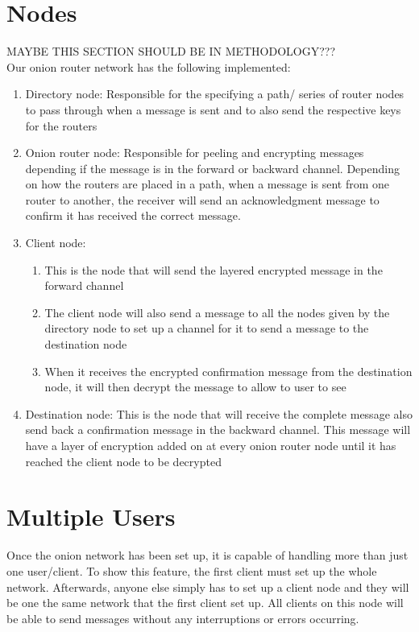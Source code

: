 \documentclass[10pt]{report}
\begin{document}
\section{Nodes}
MAYBE THIS SECTION SHOULD BE IN METHODOLOGY???\\
Our onion router network has the following implemented:
\begin{enumerate}
    \item Directory node: Responsible for the specifying a path/ series of router nodes to pass through when a message is sent and to also send the respective keys for the routers
    \item Onion router node: Responsible for peeling and encrypting messages depending if the message is in the forward or backward channel. Depending on how the routers are placed in a path, when a message is sent from one router to another, the receiver will send an acknowledgment message to confirm it has received the correct message.
    \item Client node:
    \begin{enumerate}
        \item This is the node that will send the layered encrypted message in the forward channel
        \item The client node will also send a message to all the nodes given by the directory node to set up a channel for it to send a message to the destination node
        \item When it receives the encrypted confirmation message from the destination node, it will then decrypt the message to allow to user to see
    \end{enumerate}
    \item Destination node: This is the node that will receive the complete message also send back a confirmation message in the backward channel. This message will have a layer of encryption added on at every onion router node until it has reached the client node to be decrypted
\end{enumerate}
\section{Multiple Users}
    Once the onion network has been set up, it is capable of handling more than just one user/client. To show this feature, the first client must set up the whole network. Afterwards, anyone else simply has to set up a client node and they will be one the same network that the first client set up. All clients on this node will be able to send messages without any interruptions or errors occurring.
\end{document}
